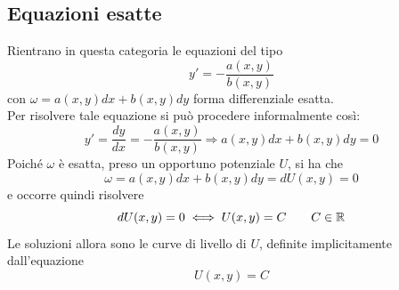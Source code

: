 \subsection{Equazioni esatte}
Rientrano in questa categoria le equazioni del tipo
\begin{equation}
    y'=-\frac{a(x,y)}{b(x,y)}
\end{equation}
con $\omega=a(x,y)dx+b(x,y)dy$ forma differenziale esatta.\\
Per risolvere tale equazione si può procedere informalmente così:
\begin{equation}
    y'=\frac{dy}{dx}=-\frac{a(x,y)}{b(x,y)} \Rightarrow a(x,y)dx+b(x,y)dy=0
\end{equation}
Poiché $\omega$ è esatta, preso un opportuno potenziale $U$, si ha che
\begin{equation}
\omega= a(x,y)dx+b(x,y)dy = dU(x,y)= 0
\end{equation}
e occorre quindi risolvere
\begin{equation}
    dU(x,y)=0 \iff U(x,y)=C \qquad C\in \mathbb{R}
\end{equation}
Le soluzioni allora sono le curve di livello di $U$, definite implicitamente dall'equazione
\begin{equation}
    U(x,y)=C
\end{equation}
